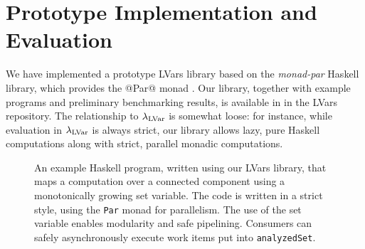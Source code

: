 \section{Prototype Implementation and Evaluation}\label{section:evaluation}

We have implemented a prototype LVars library based on
the {\em monad-par} Haskell library, which provides the @Par@ monad \cite{monad-par}.
Our library, together with example programs and preliminary
benchmarking results, is available in in the LVars repository.
{The relationship to $\lambda_{\textrm{LVar}}$ is somewhat loose: for instance,
  while evaluation in $\lambda_{\textrm{LVar}}$ is always strict, our library allows
  lazy, pure Haskell computations along with strict, parallel monadic computations.}



\begin{figure}
  
  \caption{\footnotesize 
    An example Haskell program, written using our LVars library, that
    maps a computation over a connected component using a monotonically
    growing set variable.  The code is written in a strict style, using the \lstinline|Par|
    monad for parallelism.  The use of the set variable enables modularity and
    safe pipelining.  Consumers can safely asynchronously execute work items
    put into \lstinline|analyzedSet|.}
  \label{f:bfs-lvar}
\end{figure}



